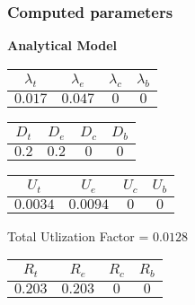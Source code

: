 \documentclass{article}
\begin{document}
\subsubsection{Computed parameters}
\begin{minipage}{0.5\textwidth}
\centering	\textbf{Analytical Model}
\begin{table}[H]
\centering
\begin{tabular}{@{}cccc@{}}
\toprule
$\lambda_t$ & $\lambda_e$ & $\lambda_c$ & $\lambda_b$\\
\midrule
$0.017$ & $0.047$ & $0$ & $0$\\
\bottomrule
\end{tabular}
\end{table}\begin{table}[H]
\centering
\begin{tabular}{@{}cccc@{}}
\toprule
$D_t$ & $D_e$ & $D_c$ & $D_b$\\
\midrule
$0.2$ & $0.2$ & $0$ & $0$\\
\bottomrule
\end{tabular}
\end{table}\begin{table}[H]
\centering
\begin{tabular}{@{}cccc@{}}
\toprule
$U_t$ & $U_e$ & $U_c$ & $U_b$\\
\midrule
$0.0034$ & $0.0094$ & $0$ & $0$\\
\bottomrule
\end{tabular}
\end{table}
\centering Total Utlization Factor = $0.0128$
\begin{table}[H]
\centering
\begin{tabular}{@{}cccc@{}}
\toprule
$R_t$ & $R_e$ & $R_c$ & $R_b$\\
\midrule
$0.203$ & $0.203$ & $0$ & $0$\\
\bottomrule
\end{tabular}
\end{table}
\end{minipage}
\end{document}
